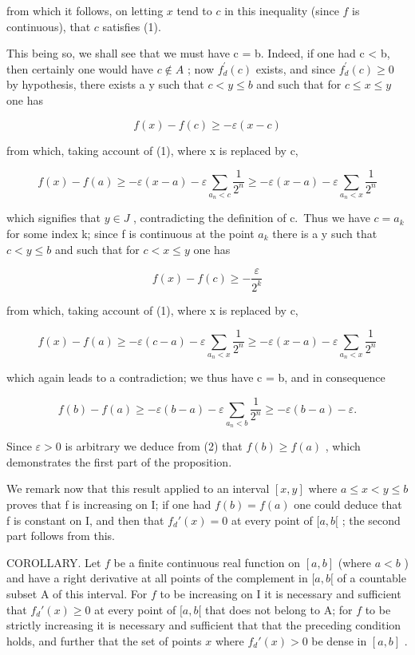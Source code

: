 from which it follows, on letting \(x\) tend to \(c\) in this inequality (since \(f\) is continuous), that \(c\) satisfies (1).

This being so, we shall see that we must have c = b. Indeed, if one had c \textless{} b, then certainly one would have \(c \notin A\) ; now \(f_{d}^{\prime}(c)\) exists, and since \(f_{d}^{\prime}(c) \geqslant 0\) by hypothesis, there exists a y such that \(c < y \leqslant b\) and such that for \(c \leqslant x \leqslant y\) one has

\[
f (x) - f (c) \geqslant - \varepsilon (x - c)
\]

from which, taking account of (1), where x is replaced by c,

\[
f (x) - f (a) \geqslant - \varepsilon (x - a) - \varepsilon \sum_ {a _ {n} <   c} \frac {1}{2 ^ {n}} \geqslant - \varepsilon (x - a) - \varepsilon \sum_ {a _ {n} <   x} \frac {1}{2 ^ {n}}
\]

which signifies that \(y \in J\) , contradicting the definition of c.~Thus we have \(c = a_{k}\) for some index k; since f is continuous at the point \(a_{k}\) there is a y such that \(c < y \leqslant b\) and such that for \(c < x \leqslant y\) one has

\[
f (x) - f (c) \geqslant - \frac {\varepsilon}{2 ^ {k}}
\]

from which, taking account of (1), where x is replaced by c,

\[
f (x) - f (a) \geqslant - \varepsilon (c - a) - \varepsilon \sum_ {a _ {n} <   x} \frac {1}{2 ^ {n}} \geqslant - \varepsilon (x - a) - \varepsilon \sum_ {a _ {n} <   x} \frac {1}{2 ^ {n}}
\]

which again leads to a contradiction; we thus have c = b, and in consequence

\[
f (b) - f (a) \geqslant - \varepsilon (b - a) - \varepsilon \sum_ {a _ {n} <   b} \frac {1}{2 ^ {n}} \geqslant - \varepsilon (b - a) - \varepsilon .\tag{2}
\]

Since \(\varepsilon > 0\) is arbitrary we deduce from (2) that \(f(b) \geqslant f(a)\) , which demonstrates the first part of the proposition.

We remark now that this result applied to an interval \([x, y]\) where \(a \leqslant x < y \leqslant b\) proves that f is increasing on I; if one had \(f(b) = f(a)\) one could deduce that f is constant on I, and then that \(f_{d}'(x) = 0\) at every point of \([a, b[\) ; the second part follows from this.

COROLLARY. Let \(f\) be a finite continuous real function on \([a, b]\) (where \(a < b\) ) and have a right derivative at all points of the complement in \([a, b[\) of a countable subset A of this interval. For \(f\) to be increasing on I it is necessary and sufficient that \(f_d'(x) \geqslant 0\) at every point of \([a, b[\) that does not belong to A; for \(f\) to be strictly increasing it is necessary and sufficient that that the preceding condition holds, and further that the set of points \(x\) where \(f_d'(x) > 0\) be dense in \([a, b]\) .

